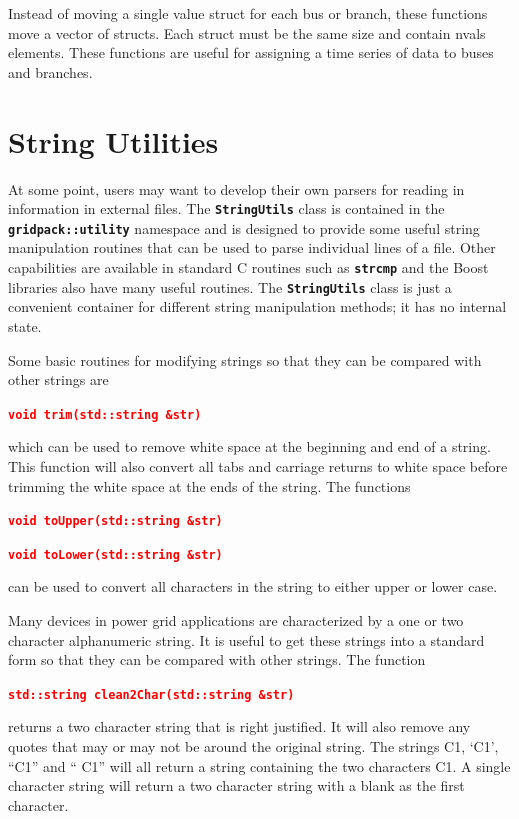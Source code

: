 \documentclass[12pt]{report} %
\begin{document}
Instead of moving a single value struct for each bus or branch, these functions move a vector of structs. Each struct must be the same size and contain nvals elements. These functions are useful for assigning a time series of data to buses and branches.

\section{String Utilities}

At some point, users may want to develop their own parsers for reading in information in external files. The \texttt{\textbf{StringUtils}} class is contained in the \texttt{\textbf{gridpack::utility}} namespace and is designed to provide some useful string manipulation routines that can be used to parse individual lines of a file. Other capabilities are available in standard C routines such as \texttt{\textbf{strcmp}} and the Boost libraries also have many useful routines. The \texttt{\textbf{StringUtils}} class is just a convenient container for different string manipulation methods; it has no internal state.

Some basic routines for modifying strings so that they can be compared with other strings are

\textcolor{red}{\texttt{\textbf{void trim(std::string \&str)}}}

which can be used to remove white space at the beginning and end of a string. This function will also convert all tabs and carriage returns to white space before trimming the white space at the ends of the string. The functions

\textcolor{red}{\texttt{\textbf{void toUpper(std::string \&str)}}}

\textcolor{red}{\texttt{\textbf{void toLower(std::string \&str)}}}

can be used to convert all characters in the string to either upper or lower case.

Many devices in power grid applications are characterized by a one or two character alphanumeric string. It is useful to get these strings into a standard form so that they can be compared with other strings. The function

\textcolor{red}{\texttt{\textbf{std::string clean2Char(std::string \&str)}}}

returns a two character string that is right justified. It will also remove any quotes that may or may not be around the original string. The strings C1, `C1', ``C1'' and ``  C1'' will all return a string containing the two characters C1. A single character string will return a two character string with a blank as the first character.
\end{document}

